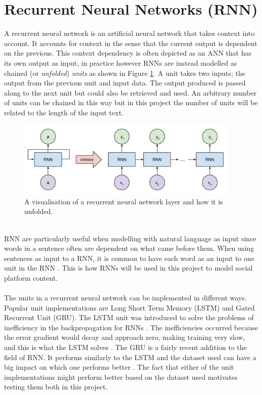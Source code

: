 \section{Recurrent Neural Networks (RNN)}
A recurrent neural network is an artificial neural network that takes context into account. It accounts for context in the sense that the current output is dependent on the previous. This context dependency is often depicted as an ANN that has its own output as input, in practice however RNNs are instead modelled as chained (or \textit{unfolded}) \textit{units} as shown in Figure \ref{fig:chained_units}. A unit takes two inputs; the output from the previous unit and input data. The output produced is passed along to the next unit but could also be retrieved and used. An arbitrary number of units can be chained in this way but in this project the number of units will be related to the length of the input text. 
\begin{figure}[h]
    \centering
    \includegraphics[width=0.95\textwidth]{figure/ann/rnn_unfold}
    \caption{A visualisation of a recurrent neural network layer and how it is unfolded.}
    \label{fig:chained_units}
\end{figure}
\\
RNN are particularly useful when modelling with natural language as input since words in a sentence often are dependent on what came before them. When using sentences as input to a RNN, it is common to have each word as an input to one unit in the RNN \parencite{palangi2016deep}. This is how RNNs will be used in this project to model social platform content.
\\\\
The units in a recurrent neural network can be implemented in different ways. Popular unit implementations are Long Short Term Memory (LSTM) and Gated Recurrent Unit (GRU). The LSTM unit was introduced to solve the problems of inefficiency in the backpropagation for RNNs \parencite{LSTMdefined}. The inefficiencies occurred because the error gradient would decay and approach zero, making training very slow, and this is what the LSTM solves \parencite{hochreiter1998vanishing}. The GRU is a fairly recent addition to the field of RNN. It performs similarly to the LSTM and the dataset used can have a big impact on which one performs better \parencite{GRUchung2014empirical}. The fact that either of the unit implementations might perform better based on the dataset used motivates testing them both in this project.


